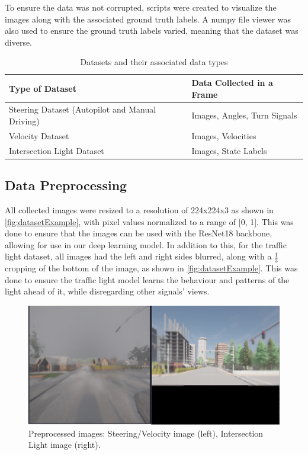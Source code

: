 \documentclass{article} %
\begin{document}
To ensure the data was not corrupted, scripts were created to visualize the images along with the associated ground truth labels. A numpy file viewer was also used to ensure the ground truth labels varied, meaning that the dataset was diverse.

\begin{table}[h]
    \centering
    \caption{Datasets and their associated data types}
    \vspace{0.5em}
    \begin{tabular}{|p{5cm}|p{7cm}|}
        \hline
        \textbf{Type of Dataset}                        & \textbf{Data Collected in a Frame} \\ \hline
        Steering Dataset (Autopilot and Manual Driving) & Images, Angles, Turn Signals       \\ \hline
        Velocity Dataset                                & Images, Velocities                 \\ \hline
        Intersection Light Dataset                      & Images, State Labels               \\ \hline
    \end{tabular}
\end{table}

\subsection{Data Preprocessing}

All collected images were resized to a resolution of 224x224x3 as shown in \autoref{fig:datasetExample}, with pixel values normalized to a range of [0, 1].
This was done to ensure that the images can be used with the ResNet18 backbone, allowing for use in our deep learning model. In addition to this, for the traffic light dataset, all images had the left and right sides blurred, along with a \(\frac{1}{3}\) cropping of the bottom of the image, as shown in \autoref{fig:datasetExample}. This was done to ensure the traffic light model learns the behaviour and patterns of the light ahead of it, while disregarding other signals' views.

\begin{figure}[H] %
    \centering
    \includegraphics[width=1.0\textwidth]{example of images in dataset.png} %
    \caption{Preprocessed images: Steering/Velocity image (left), Intersection Light image (right).}
    \label{fig:datasetExample}
\end{figure}
\end{document}
